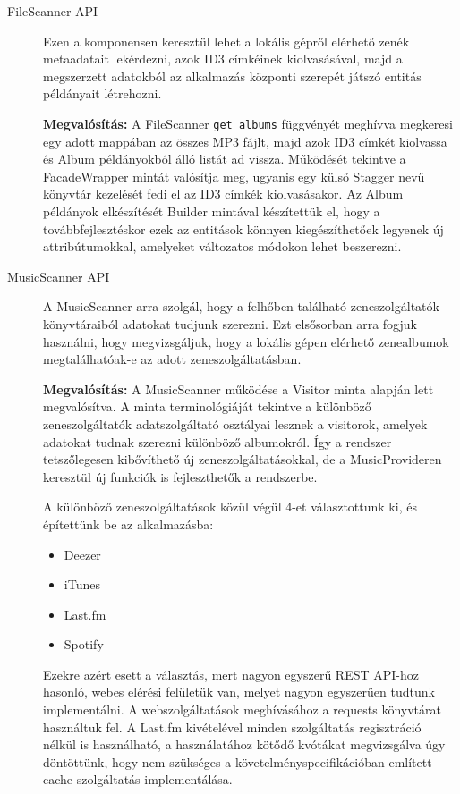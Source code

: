\begin{description}
	\item[FileScanner API] Ezen a komponensen keresztül lehet a lokális gépről elérhető zenék metaadatait lekérdezni, azok ID3 címkéinek kiolvasásával, majd a megszerzett adatokból az alkalmazás központi szerepét játszó entitás példányait létrehozni.

\textbf{Megvalósítás:}
A FileScanner \texttt{get\_albums} függvényét meghívva megkeresi egy adott mappában az összes MP3 fájlt, majd azok ID3 címkét kiolvassa és Album példányokból álló listát ad vissza. Működését tekintve a FacadeWrapper mintát valósítja meg, ugyanis egy külső Stagger nevű könyvtár kezelését fedi el az ID3 címkék kiolvasásakor. Az Album példányok elkészítését Builder mintával készítettük el, hogy a továbbfejlesztéskor ezek az entitások könnyen kiegészíthetőek legyenek új attribútumokkal, amelyeket változatos módokon lehet beszerezni.
	\item[MusicScanner API] A MusicScanner arra szolgál, hogy a felhőben található zeneszolgáltatók könyvtáraiból adatokat tudjunk szerezni. Ezt elsősorban arra fogjuk használni, hogy megvizsgáljuk, hogy a lokális gépen elérhető zenealbumok megtalálhatóak-e az adott zeneszolgáltatásban.

\textbf{Megvalósítás:}
A MusicScanner működése a Visitor minta alapján lett megvalósítva. A minta terminológiáját tekintve a különböző zeneszolgáltatók adatszolgáltató osztályai lesznek a visitorok, amelyek adatokat tudnak szerezni különböző albumokról. Így a rendszer tetszőlegesen kibővíthető új zeneszolgáltatásokkal, de a MusicProvideren keresztül új funkciók is fejleszthetők a rendszerbe.

A különböző zeneszolgáltatások közül végül 4-et választottunk ki, és építettünk be az alkalmazásba:
\begin{itemize}
	\item Deezer
	\item iTunes
	\item Last.fm
	\item Spotify
\end{itemize}

Ezekre azért esett a választás, mert nagyon egyszerű REST API-hoz hasonló, webes elérési felületük van, melyet nagyon egyszerűen tudtunk implementálni. A webszolgáltatások meghívásához a requests könyvtárat használtuk fel. A Last.fm kivételével minden szolgáltatás regisztráció nélkül is használható, a használatához kötődő kvótákat megvizsgálva úgy döntöttünk, hogy nem szükséges a követelményspecifikációban említett cache szolgáltatás implementálása.
\end{description}

